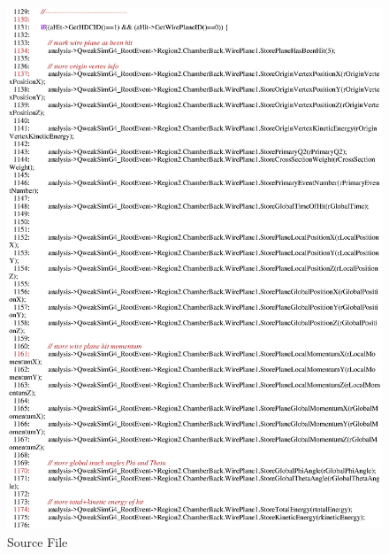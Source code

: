 \begin{figure}[h]
  \hspace{0cm}
  \includegraphics[scale=0.8]{./figures13/QweakSimEventAction.cc-p20.eps}
  \caption{Source File}
           \label{fig:XIII-SC-35}
\end{figure}

\clearpage

